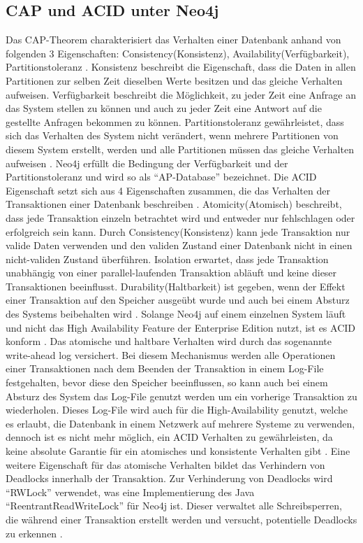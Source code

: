 \subsection{CAP und ACID unter Neo4j}
Das CAP-Theorem charakterisiert  das Verhalten einer Datenbank anhand von folgenden 3 Eigenschaften: Consistency(Konsistenz), Availability(Verfügbarkeit), Partitionstoleranz \parencite{simon2000brewer}. Konsistenz beschreibt die Eigenschaft, dass die Daten in allen Partitionen zur selben Zeit dieselben Werte besitzen und das gleiche Verhalten aufweisen. Verfügbarkeit beschreibt die Möglichkeit, zu jeder Zeit eine Anfrage an das System stellen zu können und auch zu jeder Zeit eine Antwort auf die gestellte Anfragen bekommen zu können. Partitionstoleranz gewährleistet, dass sich das Verhalten des System nicht verändert, wenn mehrere Partitionen von diesem System erstellt, werden und alle Partitionen müssen das gleiche Verhalten aufweisen  \parencite{simon2000brewer}. Neo4j erfüllt die Bedingung der Verfügbarkeit und der  Partitionstoleranz \parencite{vukotic2015neo4j} und wird so als “AP-Database” bezeichnet. \newline
Die ACID Eigenschaft setzt sich aus 4 Eigenschaften zusammen, die das Verhalten der Transaktionen einer  Datenbank beschreiben \parencite{haerder1983principles}. Atomicity(Atomisch) beschreibt, dass jede Transaktion einzeln betrachtet wird und entweder nur fehlschlagen oder erfolgreich sein kann. Durch Consistency(Konsistenz) kann jede Transaktion nur valide Daten verwenden und den validen Zustand einer Datenbank nicht in einen nicht-validen Zustand überführen. Isolation erwartet, dass jede Transaktion unabhängig von einer parallel-laufenden Transaktion abläuft und keine dieser Transaktionen beeinflusst. Durability(Haltbarkeit) ist gegeben, wenn der Effekt einer Transaktion auf den Speicher ausgeübt wurde und auch bei einem Absturz des Systems beibehalten wird \parencite{haerder1983principles}. Solange Neo4j auf einem einzelnen System läuft und nicht das High Availability Feature der Enterprise Edition nutzt, ist es ACID konform \parencite{holzschuher2013performance}. Das atomische und haltbare Verhalten wird durch das sogenannte write-ahead log versichert. Bei diesem Mechanismus  werden alle Operationen einer Transaktionen nach dem Beenden der Transaktion in einem Log-File  festgehalten, bevor diese  den Speicher beeinflussen, so kann auch bei einem Absturz des System das Log-File genutzt werden um ein vorherige Transaktion zu wiederholen.  Dieses Log-File wird auch für die High-Availability  genutzt, welche es erlaubt, die Datenbank in einem Netzwerk auf mehrere Systeme zu verwenden, dennoch ist es nicht mehr möglich, ein  ACID Verhalten zu gewährleisten, da keine absolute Garantie für ein  atomisches und konsistente Verhalten gibt \parencite{vukotic2015neo4j}. Eine weitere Eigenschaft für das atomische Verhalten bildet das Verhindern von Deadlocks innerhalb der Transaktion. Zur Verhinderung von Deadlocks wird “RWLock” verwendet, was eine Implementierung des Java “ReentrantReadWriteLock” für Neo4j ist. Dieser verwaltet alle Schreibsperren, die während einer Transaktion erstellt werden und versucht, potentielle Deadlocks zu erkennen \parencite{raj2015neo4j}.
